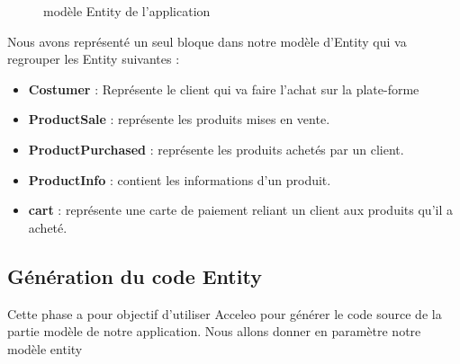 \begin{figure}[H]
  \centering
  \caption{modèle Entity de l'application}
  \label{fig:entMod}
\end{figure}

Nous avons représenté un seul bloque dans notre modèle d'Entity qui va regrouper les Entity suivantes :  

\begin{itemize}
  \item[\textbullet] \textbf{Costumer} : Représente le client qui va faire l'achat sur la plate-forme
  \item[\textbullet] \textbf{ProductSale} : représente les produits mises en vente.
  \item[\textbullet]	\textbf{ProductPurchased} : représente les produits achetés par un client.
  \item[\textbullet] \textbf{ProductInfo} : contient les informations d'un produit.
  \item[\textbullet] \textbf{cart} : représente une carte de paiement reliant un client aux produits qu'il a acheté.
   
\end{itemize}

\subsection{Génération du code Entity}
Cette phase a pour objectif d'utiliser Acceleo pour générer le code source de la partie modèle de notre application.
Nous allons donner en paramètre notre modèle entity 




\clearpage



